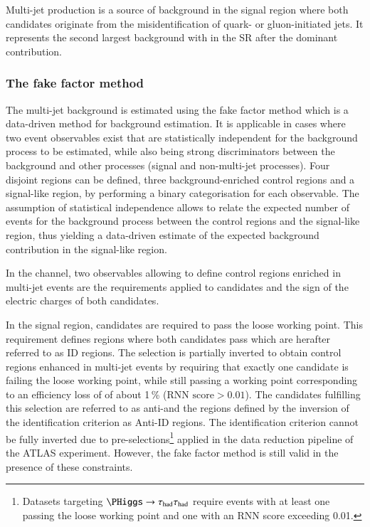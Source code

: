 \label{sec:hadhad_multijet}

Multi-jet production is a source of background in the \hadhad signal
region where both \tauhadvis candidates originate from the
misidentification of quark- or gluon-initiated jets. It represents the
second largest background with \faketauhadvis in the \hadhad SR after
the dominant \ttbarFakes contribution.

\subsubsection{The fake factor method}

The multi-jet background is estimated using the fake factor method
which is a data-driven method for background estimation. It is
applicable in cases where two event observables exist that are
statistically independent for the background process to be estimated,
while also being strong discriminators between the background and
other processes (signal and non-multi-jet processes). Four disjoint
regions can be defined, three background-enriched control regions and
a signal-like region, by performing a binary categorisation for each
observable. The assumption of statistical independence allows to
relate the expected number of events for the background process
between the control regions and the signal-like region, thus yielding
a data-driven estimate of the expected background contribution in the
signal-like region.

In the \hadhad channel, two observables allowing to define control
regions enriched in multi-jet events are the \tauid requirements
applied to \tauhadvis candidates and the sign of the electric charges
of both candidates.

In the \hadhad signal region, \tauhadvis candidates are required to
pass the loose \tauid working point. This requirement defines regions
where both \tauhadvis candidates pass \tauid which are herafter
referred to as ID regions. The selection is partially inverted to
obtain control regions enhanced in multi-jet events by requiring that
exactly one \tauhadvis candidate is failing the loose \tauid working
point, while still passing a working point corresponding to an
efficiency loss of \tauhad of about 1\,\% ($\text{RNN score} >
0.01$). The \tauhadvis candidates fulfilling this selection are
referred to as anti-\tauhadvis and the regions defined by the
inversion of the identification criterion as Anti-ID regions. The
identification criterion cannot be fully inverted due to
pre-selections\footnote{Datasets targeting $\PHiggs \to \hadhad$
  require events with at least one \tauhadvis passing the loose \tauid
  working point and one \tauhadvis with an RNN \tauid score exceeding
  0.01.} applied in the data reduction pipeline of the ATLAS
experiment. However, the fake factor method is still valid in the
presence of these constraints.


